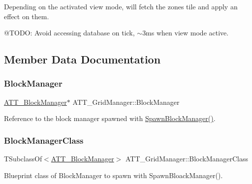 Depending on the activated view mode, will fetch the zone\textquotesingle{}s tile and apply an effect on them. 

@\+T\+O\+DO\+: Avoid accessing database on tick, $\sim$3ms when view mode active. 

\subsection{Member Data Documentation}
\mbox{\label{class_a_t_t___grid_manager_ad4f5e3050493fe0ed39bee5bb9f93182}} 
\subsubsection{\texorpdfstring{BlockManager}{BlockManager}}
{\footnotesize\ttfamily \mbox{\hyperlink{class_a_t_t___block_manager}{A\+T\+T\+\_\+\+Block\+Manager}}$\ast$ A\+T\+T\+\_\+\+Grid\+Manager\+::\+Block\+Manager}



Reference to the block manager spawned with \mbox{\hyperlink{class_a_t_t___grid_manager_aa5645338890f95f2d400420c29f82952}{Spawn\+Block\+Manager()}}. 

\mbox{\label{class_a_t_t___grid_manager_afc01cb2845f708bd5f7d5c957396a8c4}} 
\subsubsection{\texorpdfstring{BlockManagerClass}{BlockManagerClass}}
{\footnotesize\ttfamily T\+Subclass\+Of$<$\mbox{\hyperlink{class_a_t_t___block_manager}{A\+T\+T\+\_\+\+Block\+Manager}}$>$ A\+T\+T\+\_\+\+Grid\+Manager\+::\+Block\+Manager\+Class\hspace{0.3cm}{\ttfamily [protected]}}



Blueprint class of Block\+Manager to spawn with Spawn\+Bloack\+Manager(). 

\mbox{\label{class_a_t_t___grid_manager_a280e5772f55941219c918dcfe1c9dd5d}} 
